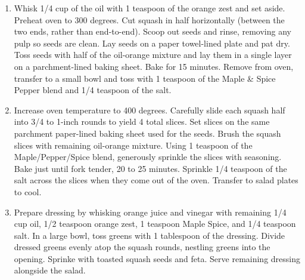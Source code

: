 \begin{enumerate}
  \item Whisk 1/4 cup of the oil with 1 teaspoon of the orange zest and set aside. Preheat oven to 300 degrees. Cut squash in half horizontally (between the two ends, rather than end-to-end). Scoop out seeds and rinse, removing any pulp so seeds are clean. Lay seeds on a paper towel-lined plate and pat dry. Toss seeds with half of the oil-orange mixture and lay them in a single layer on a parchment-lined baking sheet. Bake for 15 minutes. Remove from oven, transfer to a small bowl and toss with 1 teaspoon of the Maple \& Spice Pepper blend and 1/4 teaspoon of the salt. 

  \item Increase oven temperature to 400 degrees. Carefully slide each squash half into 3/4 to 1-inch rounds to yield 4 total slices. Set slices on the same parchment paper-lined baking sheet used for the seeds. Brush the squash slices with remaining oil-orange mixture. Using 1 teaspoon of the Maple/Pepper/Spice blend, generously sprinkle the slices with seasoning. Bake just until fork tender, 20 to 25 minutes. Sprinkle 1/4 teaspoon of the salt across the slices when they come out of the oven. Transfer to salad plates to cool. 

  \item Prepare dressing by whisking orange juice and vinegar with remaining 1/4 cup oil, 1/2 teaspoon orange zest, 1 teaspoon Maple Spice, and 1/4 teaspoon salt. In a large bowl, toss greens with 1 tablespoon of the dressing. Divide dressed greens evenly atop the squash rounds, nestling greens into the opening. Sprinke with toasted squash seeds and feta. Serve remaining dressing alongside the salad. 
\end{enumerate}
